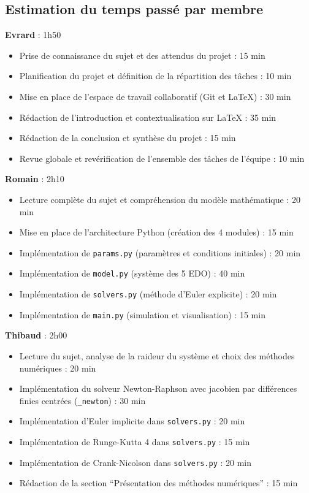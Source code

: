 \documentclass[12pt,a4paper]{article}
\begin{document}
\subsection*{Estimation du temps passé par membre}

\textbf{Evrard } : 1h50 
\begin{itemize}
    \item Prise de connaissance du sujet et des attendus du projet : 15 min
    \item Planification du projet et définition de la répartition des tâches : 10 min
    \item Mise en place de l'espace de travail collaboratif (Git et LaTeX) : 30 min
    \item Rédaction de l'introduction et contextualisation sur LaTeX : 35 min
    \item Rédaction de la conclusion et synthèse du projet : 15 min
    \item Revue globale et revérification de l'ensemble des tâches de l'équipe : 10 min
\end{itemize}

\vspace{0.5cm}
\textbf{Romain} : 2h10
\begin{itemize}
    \item Lecture complète du sujet et compréhension du modèle mathématique : 20 min
    \item Mise en place de l'architecture Python (création des 4 modules) : 15 min
    \item Implémentation de \texttt{params.py} (paramètres et conditions initiales) : 20 min
    \item Implémentation de \texttt{model.py} (système des 5 EDO) : 40 min
    \item Implémentation de \texttt{solvers.py} (méthode d'Euler explicite) : 20 min
    \item Implémentation de \texttt{main.py} (simulation et visualisation) : 15 min
\end{itemize}

\vspace{0.5cm}
\textbf{Thibaud} : 2h00
\begin{itemize}
    \item Lecture du sujet, analyse de la raideur du système et choix des méthodes numériques : 20 min
    \item Implémentation du solveur Newton-Raphson avec jacobien par différences finies centrées (\texttt{\_newton}) : 30 min
    \item Implémentation d'Euler implicite dans \texttt{solvers.py} : 20 min
    \item Implémentation de Runge-Kutta 4 dans \texttt{solvers.py} : 15 min
    \item Implémentation de Crank-Nicolson dans \texttt{solvers.py} : 20 min
    \item Rédaction de la section ``Présentation des méthodes numériques'' : 15 min
\end{itemize}
\end{document}
